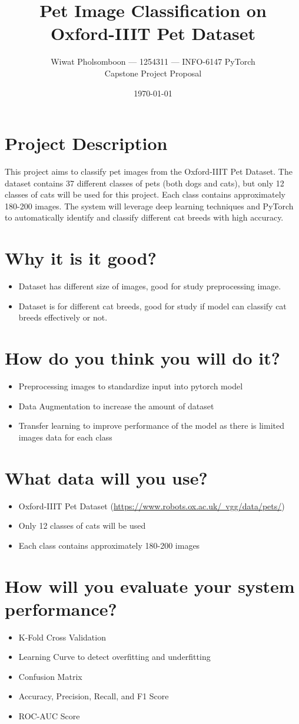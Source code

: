\documentclass[11pt]{article}
\title{Pet Image Classification on Oxford-IIIT Pet Dataset}
\author{Wiwat Pholsomboon --- 1254311 --- INFO-6147 PyTorch\\Capstone Project Proposal}
\date{\today}
\begin{document}
\maketitle

\section*{Project Description}
This project aims to classify pet images from the Oxford-IIIT Pet Dataset. The dataset contains 37 different classes of pets (both dogs and cats), but only 12 classes of cats will be used for this project. Each class contains approximately 180-200 images. The system will leverage deep learning techniques and PyTorch to automatically identify and classify different cat breeds with high accuracy.

\section*{Why it is it good?}
\begin{itemize}
    \item Dataset has different size of images, good for study preprocessing image.
    \item Dataset is for different cat breeds, good for study if model can classify cat breeds effectively or not.
\end{itemize}

\section*{How do you think you will do it?}
\begin{itemize}
    \item Preprocessing images to standardize input into pytorch model
    \item Data Augmentation to increase the amount of dataset
    \item Transfer learning to improve performance of the model as there is limited images data for each class
\end{itemize}

\section*{What data will you use?}
\begin{itemize}
    \item Oxford-IIIT Pet Dataset (\href{https://www.robots.ox.ac.uk/~vgg/data/pets/}{https://www.robots.ox.ac.uk/~vgg/data/pets/})
    \item Only 12 classes of cats will be used
    \item Each class contains approximately 180-200 images
\end{itemize}

\section*{How will you evaluate your system performance?}
\begin{itemize}
    \item K-Fold Cross Validation
    \item Learning Curve to detect overfitting and underfitting
    \item Confusion Matrix
    \item Accuracy, Precision, Recall, and F1 Score
    \item ROC-AUC Score
\end{itemize}
\end{document}
